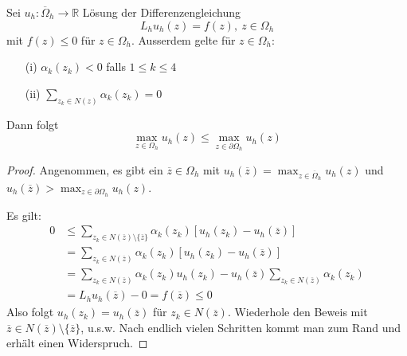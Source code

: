 \begin{satz}
Sei $u_h: \overline \Omega_h \to \mathbb R$ Lösung der Differenzengleichung
\[
L_h u_h(z) = f(z), \ z \in \Omega_h
\]
mit $f(z) \leq 0$ für $z \in \Omega_h$.
Ausserdem gelte für $z \in \Omega_h$:
\begin{itemize}
\item[(i)] $ \alpha_k(z_k) < 0$ falls $1 \leq k \leq 4$
\item[(ii)] $\sum_{z_k \in N(z)} \alpha_k(z_k) = 0 $
\end{itemize}
Dann folgt
\[
\max_{z \in \Omega_h} u_h(z) \leq \max_{z \in \partial \Omega_h} u_h(z)
\]
\end{satz}
\begin{proof}
Angenommen, es gibt ein $\overline z \in \Omega_h$ mit $u_h(\overline z) = \max_{z \in \overline \Omega_h} u_h(z)$
und $u_h(\overline z) > \max_{z \in \partial \Omega_h} u_h(z)$.

Es gilt:
\begin{align*}
0 &\leq \sum_{z_k \in N(\overline z) \setminus \{ \overline z \}} \alpha_k(z_k) \left[ u_h(z_k) - u_h(\overline z) \right] \\
    &= \sum_{z_k \in N(\overline z)} \alpha_k (z_k) \left[ u_h(z_k) - u_h(\overline z) \right] \\
    &= \sum_{z_k \in N(\overline z)} \alpha_k (z_k) u_h(z_k) - u_h(\overline z) \sum_{z_k \in N(\overline z)} \alpha_k(z_k) \\
    &= L_h u_h(\overline z) - 0 = f(\overline z) \leq 0
\end{align*}
Also folgt $u_h(z_k) = u_h(\overline z)$ für $z_k \in N(\overline z)$.
Wiederhole den Beweis mit $\overline z \in N(\overline z)\setminus \{\overline z\}$, u.s.w.
Nach endlich vielen Schritten kommt man zum Rand und erhält einen Widerspruch.
\end{proof}

